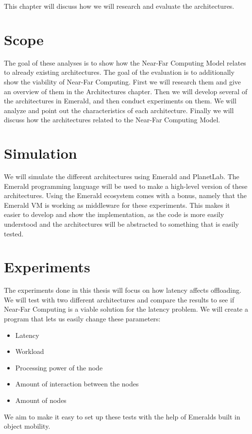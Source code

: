 This chapter will discuss how we will research and evaluate the architectures.


\section{Scope}
The goal of these analyses is to show how the Near-Far Computing Model relates to already existing architectures. The goal of the evaluation is to additionally show the viability of Near-Far Computing. First we will research them and give an overview of them in the Architectures chapter. Then we will develop several of the architectures in Emerald, and then conduct experiments on them. We will analyze and point out the characteristics of each architecture. Finally we will discuss how the architectures related to the Near-Far Computing Model.




\section{Simulation}
We will simulate the different architectures using Emerald and PlanetLab. The Emerald programming language will be used to make a high-level version of these architectures. Using the Emerald ecosystem comes with a bonus, namely that the Emerald VM is working as middleware for these experiments. This makes it easier to develop and show the implementation, as the code is more easily understood and the architectures will be abstracted to something that is easily tested.








\section{Experiments}
The experiments done in this thesis will focus on how latency affects offloading. We will test with two different architectures and compare the results to see if Near-Far Computing is a viable solution for the latency problem. We will create a program that lets us easily change these parameters:
\begin{itemize}
    \item Latency
    \item Workload
    \item Processing power of the node
    \item Amount of interaction between the nodes
    \item Amount of nodes
\end{itemize}
We aim to make it easy to set up these tests with the help of Emeralds built in object mobility. 


